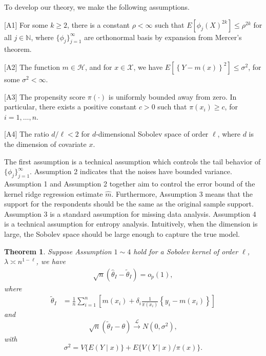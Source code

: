 \documentclass[12pt]{article}
\newtheorem{theorem}{Theorem}
\newcommand{\bx}{{x}}
\def\wh{\widehat}
\def\wt{\widetilde}
\begin{document}
To develop our theory, we  make the following  assumptions.
 \begin{description}
 
 \item {[A1]}
 \label{A1}
 	For some $k \geq 2$, there is a constant $\rho < \infty$ such that $E[ \phi_{j}(X)^{2k} ] \leq \rho^{2k}$ for all 
 	$j \in \mathbb{N}$, where $\{\phi_{j}\}_{j=1}^{\infty}$ are orthonormal basis by expansion from Mercer's theorem.

 \item {[A2]}
 \label{A2}
 	The function $m \in \mathcal{H}$, and for $\bx \in \mathcal{X}$, we have $E[\left\{ Y -  m(\bx)\right\}^{2} ] \leq \sigma^{2}$, {for some  $\sigma^{2} < \infty$.}

\item {[A3]}
\label{A3}
     The propensity score $\pi(\cdot)$ is uniformly bounded away from zero. In particular, there exists a positive constant $c > 0$ such that 
     	$\pi(\bx_{i}) \geq c$, for $i = 1, \ldots, n$.

\item {[A4]}
 \label{A4}
     The ratio $d/\ell < 2$ for $d$-dimensional Sobolev space of order $\ell$, where $d$ is the dimension of covariate $\bx$.
\end{description}


The first assumption is a technical assumption which controls the tail behavior of $\{\phi_{j}\}_{j=1}^{\infty}$. Assumption 2 indicates that the noises have bounded variance. Assumption 1 and Assumption 2 together aim to control the error bound of the kernel ridge regression estimate $\wh{m}$. {Furthermore}, Assumption 3 means that the support for the respondents should be the same as  the original sample support. Assumption 3 is a standard assumption for missing data analysis. Assumption 4 is a technical assumption for entropy analysis. Intuitively, when the dimension is large, the Sobolev space should be large enough to capture the true model. 


\begin{theorem}\label{main theorem}
Suppose Assumption $1 \sim 4$ hold for a Sobolev kernel of order $\ell$, $\lambda \asymp   n^{1-\ell}$, we have
\begin{align}\label{rate}
 \sqrt{n}(\wh{\theta}_{I} - \wt{\theta}_{I} ) = o_{p}(1), 
\end{align}
where 
\begin{align}\label{tilde_theta}
\wt{\theta}_{I} &= \frac{1}{n}\sum_{i=1}^{n} \left[ m(\bx_{i}) + \delta_{i} \frac{1}{\pi(\bx_{i})}  \left\{ y_{i} - m(\bx_{i})\right\} 
   \right] 
\end{align}
and 
\textcolor{blue}{}
$$\sqrt{n} \left( \tilde{\theta}_I - \theta \right) \stackrel{\mathcal{L}}{\longrightarrow}  N(0, \sigma^2 ) ,
$$
 with 
$$ \sigma^2 = V\{ E( Y \mid \bx) \} + E\{ V( Y \mid \bx)/\pi( \bx)   \} . $$ 

\end{theorem}
\end{document}

